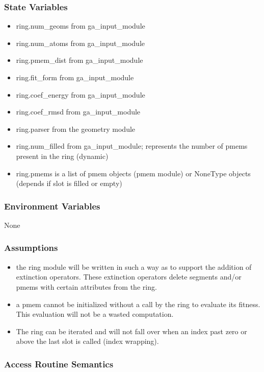 \documentclass[12pt, titlepage]{article}
\begin{document}
\subsubsection{State Variables}

\begin{itemize}
\item ring.num\_geoms from ga\_input\_module
\item ring.num\_atoms from ga\_input\_module
\item ring.pmem\_dist from ga\_input\_module
\item ring.fit\_form from ga\_input\_module
\item ring.coef\_energy from ga\_input\_module
\item ring.coef\_rmsd from ga\_input\_module
\item ring.parser from the geometry module
\item ring.num\_filled from ga\_input\_module; represents the number of pmems 
present in the ring (dynamic)
\item ring.pmems is a list of pmem objects (pmem module) or NoneType objects 
(depends if slot is filled or empty)
\end{itemize}

\subsubsection{Environment Variables}

None

\subsubsection{Assumptions}

\begin{itemize}
	\item the ring module will be written in such a way as to support the 
	addition of extinction operators. These extinction operators delete 
	segments and/or pmems with certain attributes from the ring.
	\item a pmem cannot be initialized without a call by the ring to evaluate 
	its fitness. This evaluation will not be a wasted computation.
	\item The ring can be iterated and will not fall over when an index past 
	zero or above the last slot is called (index wrapping).
\end{itemize}

\subsubsection{Access Routine Semantics}
\end{document}
